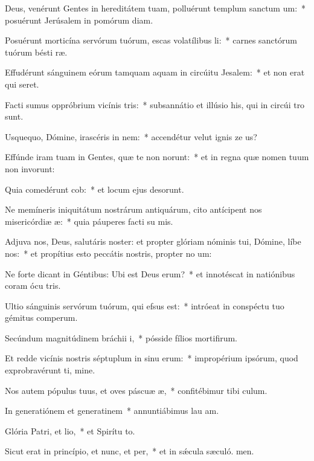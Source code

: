 \item Deus, venérunt Gentes in hereditátem tuam, polluérunt templum sanctum um:~* posuérunt Jerúsalem in pomórum diam.
\item Posuérunt morticína servórum tuórum, escas volatílibus li:~* carnes sanctórum tuórum bésti ræ.
\item Effudérunt sánguinem eórum tamquam aquam in circúitu Jesalem:~* et non erat qui seret.
\item Facti sumus oppróbrium vicínis tris:~* subsannátio et illúsio his, qui in circúi tro sunt.
\item Usquequo, Dómine, irascéris in nem:~* accendétur velut ignis ze us?
\item Effúnde iram tuam in Gentes, quæ te non norunt:~* et in regna quæ nomen tuum non invorunt:
\item Quia comedérunt cob:~* et locum ejus desorunt.
\item Ne memíneris iniquitátum nostrárum antiquárum, cito antícipent nos misericórdiæ æ:~* quia páuperes facti su mis.
\item Adjuva nos, Deus, salutáris noster: et propter glóriam nóminis tui, Dómine, líbe nos:~* et propítius esto peccátis nostris, propter no um:
\item Ne forte dicant in Géntibus: Ubi est Deus erum?~* et innotéscat in natiónibus coram ócu tris.
\item Ultio sánguinis servórum tuórum, qui efsus est:~* intróeat in conspéctu tuo gémitus comperum.
\item Secúndum magnitúdinem bráchii i,~* pósside fílios mortifirum.
\item Et redde vicínis nostris séptuplum in sinu erum:~* impropérium ipsórum, quod exprobravérunt ti, mine.
\item Nos autem pópulus tuus, et oves páscuæ æ,~* confitébimur tibi  culum.
\item In generatiónem et generatinem~* annuntiábimus lau am.
\item Glória Patri, et lio,~* et Spirítu to.
\item Sicut erat in princípio, et nunc, et per,~* et in sǽcula sæculó. men.
